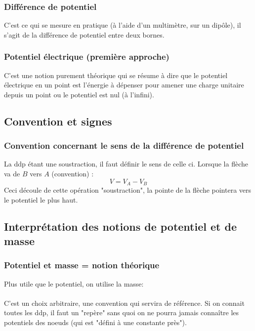 \documentclass[11pt, a4paper, openany]{book}
\begin{document}
		\subsubsection{Différence de potentiel}
		C'est ce qui se mesure en pratique (à l'aide d'un multimètre, sur un dipôle), il s'agit de la différence de potentiel entre deux bornes.
		
		\subsubsection{Potentiel électrique (première approche)}
		C'est une notion purement théorique qui se résume à dire que le potentiel électrique en un point est l'énergie à dépenser pour amener une charge unitaire depuis un point ou le potentiel est nul (à l'infini).
		
		\subsection{Convention et signes}
		\subsubsection{Convention concernant le sens de la différence de potentiel}
		La ddp étant une soustraction, il faut définir le sens de celle ci.
		Lorsque la flèche va de $B$ vers $A$ (convention) :
		\begin{equation}
		V = V_A - V_B
		\end{equation}
		Ceci découle de cette opération "soustraction", la pointe de la flèche pointera vers le potentiel le plus haut.
		
		\subsection{Interprétation des notions de potentiel et de masse}
		\subsubsection{Potentiel et masse = notion théorique}
		Plus utile que le potentiel, on utilise la masse:\\
		\ \\
		
		C'est un choix arbitraire, une convention qui servira de référence.
		Si on connait toutes les ddp, il faut un "repère" sans quoi on ne pourra jamais connaître les potentiels des noeuds (qui est "défini à une constante près").
		
\end{document}
